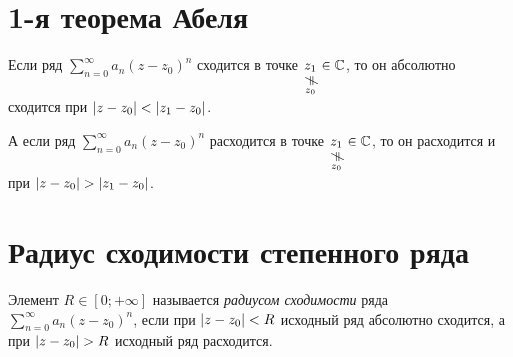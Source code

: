 \section{1-я теорема Абеля}

\begin{theorem}
	Если ряд $\sum_{n=0}^{\infty}a_n(z-z_0)^n$ сходится в точке $\nequalto{z_1}{z_0} \in \C$, то он абсолютно сходится при $\left\lvert z-z_0\right\rvert < \left\lvert z_1 - z_0\right\rvert$.

	А если ряд $\sum_{n=0}^{\infty}a_n(z-z_0)^n$ расходится в точке $\nequalto{z_1}{z_0}\in \C$, то он расходится и при $\left\lvert z-z_0\right\rvert > \left\lvert z_1-z_0\right\rvert$.
\end{theorem}

\section{Радиус сходимости степенного ряда}

\begin{definition}
	Элемент $R \in [0 ; +\infty]$ называется \emph{радиусом сходимости} ряда $\sum_{n=0}^{\infty}a_n(z-z_0)^n$, если при $\left\lvert z-z_0\right\rvert < R$ исходный ряд абсолютно сходится, а при $\left\lvert z-z_0\right\rvert > R$ исходный ряд расходится.
\end{definition}
